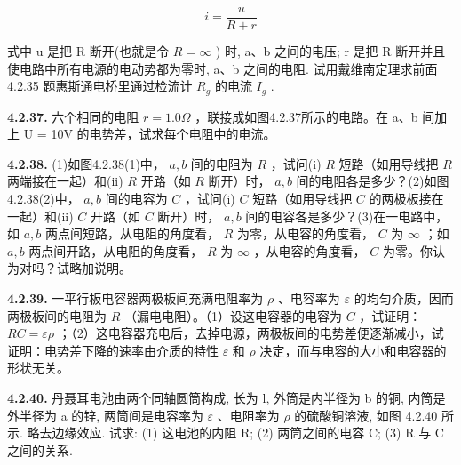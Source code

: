 \[
i = \frac {u}{R + r}
\]

式中 u 是把 R 断开(也就是令 $R = \infty$ ) 时, a、b 之间的电压; r 是把 R 断开并且使电路中所有电源的电动势都为零时, a、b 之间的电阻. 试用戴维南定理求前面 4.2.35 题惠斯通电桥里通过检流计 $R_{g}$ 的电流 $I_{g}$ .

\begin{center}
\end{center}

\vfill
\newpage

\textbf{4.2.37.} 六个相同的电阻 $r = 1.0\Omega$ ，联接成如图4.2.37所示的电路。在 a、b 间加上 U = 10V 的电势差，试求每个电阻中的电流。

\vfill
\newpage

\textbf{4.2.38.} (1)如图4.2.38(1)中， $a, b$ 间的电阻为 $R$ ，试问(i) $R$ 短路（如用导线把 $R$ 两端接在一起）和(ii) $R$ 开路（如 $R$ 断开）时， $a, b$ 间的电阻各是多少？(2)如图4.2.38(2)中， $a, b$ 间的电容为 $C$ ，试问(i) $C$ 短路（如用导线把 $C$ 的两极板接在一起）和(ii) $C$ 开路（如 $C$ 断开）时， $a, b$ 间的电容各是多少？(3)在一电路中，如 $a, b$ 两点间短路，从电阻的角度看， $R$ 为零，从电容的角度看， $C$ 为 $\infty$ ；如 $a, b$ 两点间开路，从电阻的角度看， $R$ 为 $\infty$ ，从电容的角度看， $C$ 为零。你认为对吗？试略加说明。

\begin{center}
  \begin{minipage}[b]{0.47\linewidth}
    \centering
  \end{minipage}\hfill
  \begin{minipage}[b]{0.47\linewidth}
    \centering
  \end{minipage}
\end{center}

\vfill
\newpage

\textbf{4.2.39.} 一平行板电容器两极板间充满电阻率为 $\rho$ 、电容率为 $\varepsilon$ 的均匀介质，因而两极板间的电阻为 $R$ （漏电电阻）。（1）设这电容器的电容为 $C$ ，试证明： $RC = \varepsilon \rho$ ；（2）这电容器充电后，去掉电源，两极板间的电势差便逐渐减小，试证明：电势差下降的速率由介质的特性 $\varepsilon$ 和 $\rho$ 决定，而与电容的大小和电容器的形状无关。

\vfill
\newpage

\textbf{4.2.40.} 丹聂耳电池由两个同轴圆筒构成, 长为 l, 外筒是内半径为 b 的铜, 内筒是外半径为 a 的锌, 两筒间是电容率为 $\varepsilon$ 、电阻率为 $\rho$ 的硫酸铜溶液, 如图 4.2.40 所示. 略去边缘效应. 试求: (1) 这电池的内阻 R; (2) 两筒之间的电容 C; (3) R 与 C 之间的关系.

